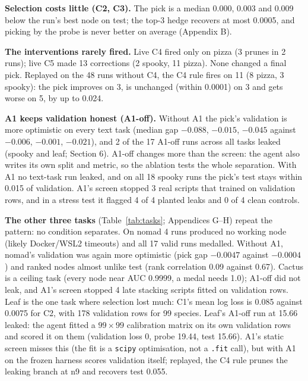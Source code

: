 \documentclass[11pt]{article}
\begin{document}
\textbf{Selection costs little (C2, C3).} The pick is a median 0.000, 0.003 and 0.009
below the run's best node on test; the top-3 hedge recovers at most 0.0005, and picking
by the probe is never better on average (Appendix B).

\textbf{The interventions rarely fired.} Live C4 fired only on pizza (3 prunes in 2
runs); live C5 made 13 corrections (2 spooky, 11 pizza). None changed a final pick.
Replayed on the 48 runs without C4, the C4 rule fires on 11 (8 pizza, 3 spooky): the
pick improves on 3, is unchanged (within 0.0001) on 3 and gets worse on 5, by up to 0.024.

\textbf{A1 keeps validation honest (A1-off).} Without A1 the pick's validation is more
optimistic on every text task (median gap $-0.088$, $-0.015$, $-0.045$ against $-0.006$,
$-0.001$, $-0.021$), and 2 of the 17 A1-off runs across all tasks leaked (spooky and
leaf; Section 6). A1-off changes more than the screen: the agent also writes its own
split and metric, so the ablation tests the whole separation. With A1 no text-task run
leaked, and on all 18 spooky runs the pick's test stays within 0.015 of validation. A1's screen stopped 3
real scripts that trained on validation rows, and in a stress test it flagged 4 of 4
planted leaks and 0 of 4 clean controls.

\textbf{The other three tasks} (Table~\ref{tab:tasks}; Appendices G--H) repeat the
pattern: no condition separates. On nomad 4 runs produced no working node (likely
Docker/WSL2 timeouts) and all 17 valid runs medalled. Without A1, nomad's
validation was again more optimistic (pick gap $-0.0047$ against $-0.0004$) and ranked
nodes almost unlike test (rank correlation 0.09 against 0.67). Cactus is a ceiling task
(every node near AUC 0.9999, a medal needs 1.0); A1-off did not leak, and A1's screen
stopped 4 late stacking scripts fitted on validation rows. Leaf is the one task where selection lost much:
C1's mean log loss is 0.085 against 0.0075 for C2, with 178 validation rows for 99
species. Leaf's A1-off run
at 15.66 leaked: the agent fitted a $99\times99$ calibration matrix on its own validation
rows and scored it on them (validation loss 0, probe 19.44, test 15.66). A1's static
screen misses this (the fit is a \texttt{scipy} optimisation, not a \texttt{.fit} call),
but with A1 on the frozen harness scores validation itself; replayed, the C4 rule prunes
the leaking branch at n9 and recovers test 0.055.
\end{document}
